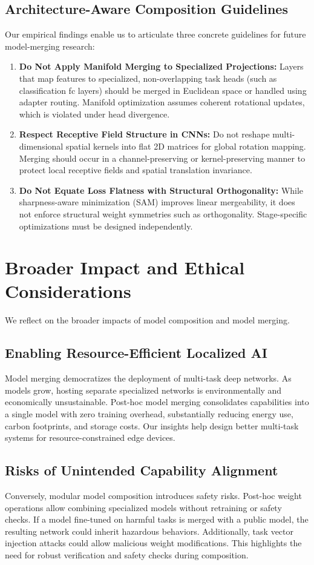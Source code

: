 \documentclass{article}
\begin{document}
\subsection{Architecture-Aware Composition Guidelines}
Our empirical findings enable us to articulate three concrete guidelines for future model-merging research:
\begin{enumerate}
    \item \textbf{Do Not Apply Manifold Merging to Specialized Projections:} Layers that map features to specialized, non-overlapping task heads (such as classification fc layers) should be merged in Euclidean space or handled using adapter routing. Manifold optimization assumes coherent rotational updates, which is violated under head divergence.
    \item \textbf{Respect Receptive Field Structure in CNNs:} Do not reshape multi-dimensional spatial kernels into flat 2D matrices for global rotation mapping. Merging should occur in a channel-preserving or kernel-preserving manner to protect local receptive fields and spatial translation invariance.
    \item \textbf{Do Not Equate Loss Flatness with Structural Orthogonality:} While sharpness-aware minimization (SAM) improves linear mergeability, it does not enforce structural weight symmetries such as orthogonality. Stage-specific optimizations must be designed independently.
\end{enumerate}

\section{Broader Impact and Ethical Considerations}
\label{sec:impact}
We reflect on the broader impacts of model composition and model merging. 

\subsection{Enabling Resource-Efficient Localized AI}
Model merging democratizes the deployment of multi-task deep networks. As models grow, hosting separate specialized networks is environmentally and economically unsustainable. Post-hoc model merging consolidates capabilities into a single model with zero training overhead, substantially reducing energy use, carbon footprints, and storage costs. Our insights help design better multi-task systems for resource-constrained edge devices.

\subsection{Risks of Unintended Capability Alignment}
Conversely, modular model composition introduces safety risks. Post-hoc weight operations allow combining specialized models without retraining or safety checks. If a model fine-tuned on harmful tasks is merged with a public model, the resulting network could inherit hazardous behaviors. Additionally, task vector injection attacks could allow malicious weight modifications. This highlights the need for robust verification and safety checks during composition.
\end{document}

